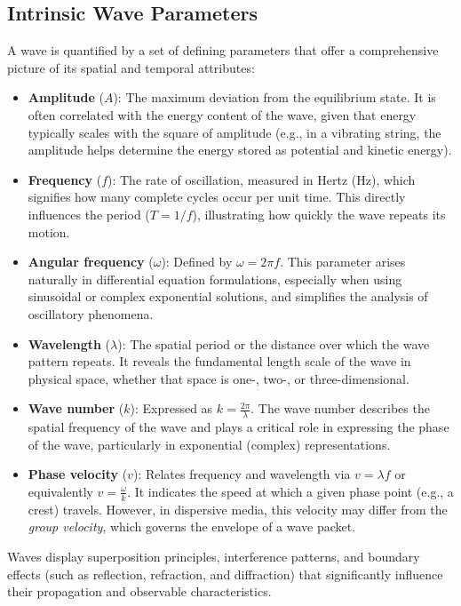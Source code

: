 \documentclass{article}
\begin{document}
\subsection{Intrinsic Wave Parameters}
A wave is quantified by a set of defining parameters that offer a comprehensive picture of its spatial and temporal attributes:
\begin{itemize}
    \item \textbf{Amplitude} ($A$): The maximum deviation from the equilibrium state. It is often correlated with the energy content of the wave, given that energy typically scales with the square of amplitude (e.g., in a vibrating string, the amplitude helps determine the energy stored as potential and kinetic energy).
    \item \textbf{Frequency} ($f$): The rate of oscillation, measured in Hertz (Hz), which signifies how many complete cycles occur per unit time. This directly influences the period ($T = 1/f$), illustrating how quickly the wave repeats its motion.
    \item \textbf{Angular frequency} ($\omega$): Defined by $\omega = 2\pi f$. This parameter arises naturally in differential equation formulations, especially when using sinusoidal or complex exponential solutions, and simplifies the analysis of oscillatory phenomena.
    \item \textbf{Wavelength} ($\lambda$): The spatial period or the distance over which the wave pattern repeats. It reveals the fundamental length scale of the wave in physical space, whether that space is one-, two-, or three-dimensional.
    \item \textbf{Wave number} ($k$): Expressed as $k = \frac{2\pi}{\lambda}$. The wave number describes the spatial frequency of the wave and plays a critical role in expressing the phase of the wave, particularly in exponential (complex) representations.
    \item \textbf{Phase velocity} ($v$): Relates frequency and wavelength via $v = \lambda f$ or equivalently $v = \frac{\omega}{k}$. It indicates the speed at which a given phase point (e.g., a crest) travels. However, in dispersive media, this velocity may differ from the \emph{group velocity}, which governs the envelope of a wave packet.
\end{itemize}

Waves display superposition principles, interference patterns, and boundary effects (such as reflection, refraction, and diffraction) that significantly influence their propagation and observable characteristics.
\end{document}
